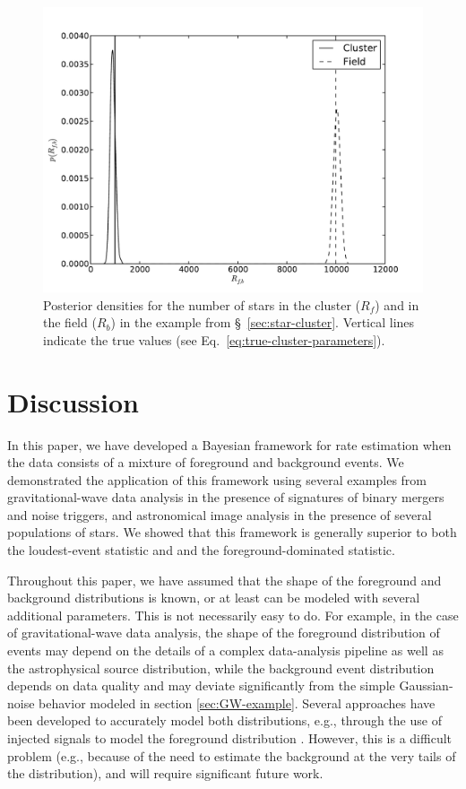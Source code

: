 \documentclass[aps,prd,reprint,nofootinbib]{revtex4-1}
\begin{document}
\begin{figure}
  \includegraphics[width=\columnwidth]{numbers}
  \caption{\label{fig:cluster-number} Posterior densities for the
    number of stars in the cluster ($R_f$) and in the field ($R_b$) in
    the example from \S~\ref{sec:star-cluster}.  Vertical lines
    indicate the true values (see
    Eq.~\eqref{eq:true-cluster-parameters}). }
\end{figure}

\section{Discussion}\label{sec:discussion}

In this paper, we have developed a Bayesian framework for rate
estimation when the data consists of a mixture of foreground and
background events.  We demonstrated the application of this framework
using several examples from gravitational-wave data analysis in the
presence of signatures of binary mergers and noise triggers, and
astronomical image analysis in the presence of several populations of
stars.  We showed that this framework is generally superior to both
the loudest-event statistic and and the foreground-dominated
statistic.

Throughout this paper, we have assumed that the shape of the
foreground and background distributions is known, or at least can be
modeled with several additional parameters.  This is not necessarily
easy to do.  For example, in the case of gravitational-wave data
analysis, the shape of the foreground distribution of events may
depend on the details of a complex data-analysis pipeline as well as
the astrophysical source distribution, while the background event
distribution depends on data quality and may deviate significantly
from the simple Gaussian-noise behavior modeled in section
\ref{sec:GW-example}.  Several approaches have been developed to
accurately model both distributions, e.g., through the use of injected
signals to model the foreground distribution \cite{ihope,CannonHannaKeppel:2012}.
However, this is a difficult problem (e.g., because of the need to
estimate the background at the very tails of the distribution), and
will require significant future work.
\end{document}

